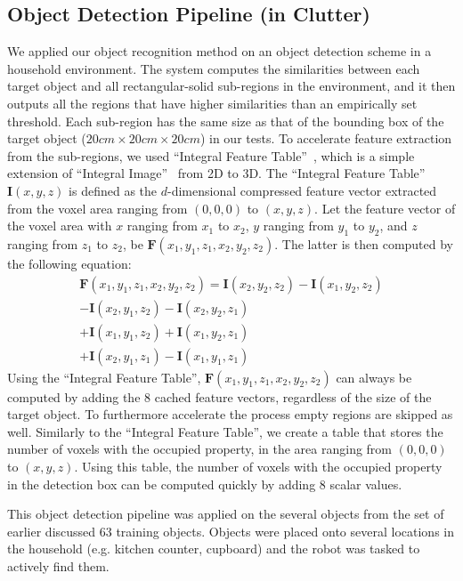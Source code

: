 \documentclass[conference]{sty/IEEEtran}
\begin{document}
\subsection{Object Detection Pipeline (in Clutter)}
\label{sec:recognition}
We applied our object recognition method on an object detection scheme in a household
environment. The system computes the similarities between each target object and all 
rectangular-solid sub-regions in the environment, and it then outputs all the regions
that have higher similarities than an empirically set threshold.
Each sub-region has the same size as that of the bounding box of the target object 
($20cm\times20cm\times20cm$) in our tests.
To accelerate feature extraction from the sub-regions, we used ``Integral Feature Table''~\cite{kanezaki2010tvc}, 
which is a simple extension of ``Integral Image''~\cite{viola2001} from 2D to 3D.
The ``Integral Feature Table'' $\bm{I}(x,y,z)$ is defined as the $d$-dimensional 
compressed feature vector extracted from the voxel area ranging from $(0,0,0)$ to $(x,y,z)$.
Let the feature vector of the voxel area with $x$ ranging from $x_1$ to $x_2$,
$y$ ranging from $y_1$ to $y_2$, and $z$ ranging from $z_1$ to $z_2$, be $\bm{F}(x_1,y_1,z_1,x_2,y_2,z_2)$.
The latter is then computed by the following equation:
\begin{eqnarray*}\label{eq:sat}
\bm{F}(x_1,y_1,z_1,x_2,y_2,z_2) = \bm{I}(x_2,y_2,z_2) - \bm{I}(x_1,y_2,z_2)
                           \\ - \bm{I}(x_2,y_1,z_2) - \bm{I}(x_2,y_2,z_1)
                           \\ + \bm{I}(x_1,y_1,z_2) + \bm{I}(x_1,y_2,z_1)
                           \\ + \bm{I}(x_2,y_1,z_1) - \bm{I}(x_1,y_1,z_1)
\end{eqnarray*}
Using the ``Integral Feature Table'', $\bm{F}(x_1,y_1,z_1,x_2,y_2,z_2)$ can always be 
computed by adding the 8 cached feature vectors, regardless of the size of the target object.
To furthermore accelerate the process empty regions are skipped as well.
Similarly to the ``Integral Feature Table'', we create a table that stores
the number of voxels with the occupied property, in the area ranging from $(0,0,0)$ to $(x,y,z)$.
Using this table, the number of voxels with the occupied property in the detection 
box can be computed quickly by adding 8 scalar values.

This object detection pipeline was applied on the several objects from the set of 
earlier discussed 63 training objects. Objects were placed onto several locations in the household
(e.g. kitchen counter, cupboard) and the robot was tasked to actively find them.
\end{document}
